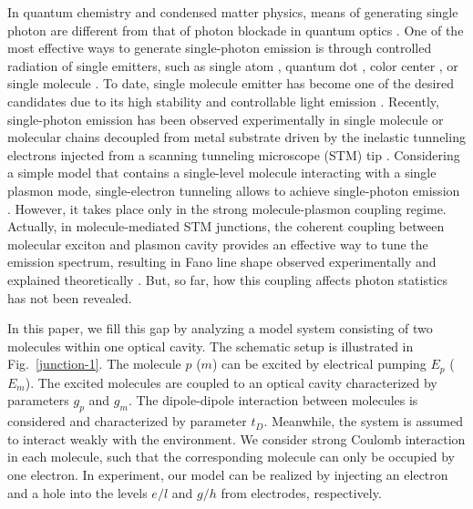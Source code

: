 \documentclass[aps,prb,
superscriptaddress,
,twocolumn
,floatfix,footinbib,longbibliography,
]{revtex4-2}
\begin{document}
In quantum chemistry and condensed matter physics, means of generating single photon are different from that of photon blockade in quantum optics
\cite{yuan2002electrically,merino2015exciton,roslawska2018single,roslawska2020atomic}. One of the most effective ways to generate single-photon emission is through controlled radiation of single emitters, such as single atom \cite{PhysRevLett.39.691}, quantum dot \cite{yuan2002electrically}, color center \cite{mizuochi2012electrically}, or single molecule \cite{nothaft2012electrically}. To date, single molecule emitter has become one of the desired candidates due to its high stability and controllable light emission \cite{qiu2003vibrationally,wu2006atomic,dong2010generation, PhysRevLett.109.186601,jiang2015distinguishing,zhang2016visualizing,PhysRevLett.122.233901,wu2019controllable,PhysRevLett.122.177401,dong2020microscopic,doppagne2020single}.
%
Recently, single-photon emission has been observed experimentally in single molecule or molecular chains decoupled from metal substrate driven
by the inelastic tunneling electrons injected from a scanning tunneling microscope (STM) tip \cite{zhang2017electrically,PhysRevLett.122.233901}. Considering a simple model that contains a single-level molecule interacting with a single plasmon mode, single-electron tunneling allows to achieve single-photon emission \cite{PhysRevLett.123.246601}. However, it takes place only in the strong molecule-plasmon coupling regime.
Actually, in molecule-mediated STM junctions, the coherent coupling between molecular exciton and plasmon cavity provides an effective way to tune the emission spectrum,
resulting in Fano line shape observed experimentally \cite{PhysRevLett.116.036802,zhang2017sub,PhysRevLett.119.013901}
and explained theoretically \cite{nian2018fano,nian2019mechanism}.
But, so far, how this coupling affects photon statistics has not been revealed.


In this paper, we fill this gap by analyzing a model system consisting of two molecules within one optical cavity.
The schematic setup is illustrated in Fig.~\ref{junction-1}. The molecule $p$ ($m$) can be excited by electrical pumping $E_{p}$ ($E_{m}$). The excited molecules are coupled to an optical cavity characterized by parameters $g_{p}$ and $g_{m}$. The dipole-dipole interaction between molecules is considered and characterized by parameter $t_{D}$. Meanwhile, the system is assumed to interact weakly with the environment. 
We consider strong Coulomb interaction in each molecule, such that the corresponding molecule can only be occupied by one electron. In experiment, our model can be realized by injecting an electron and a hole into the levels $e/l$ and $g/h$ from electrodes, respectively. 
\end{document}
